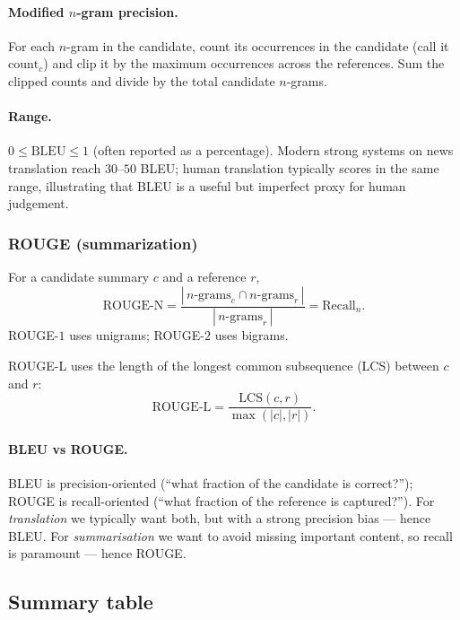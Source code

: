 \paragraph{Modified $n$-gram precision.} For each $n$-gram in the candidate, count its occurrences in the candidate (call it $\mathrm{count}_c$) and clip it by the maximum occurrences across the references. Sum the clipped counts and divide by the total candidate $n$-grams.

\paragraph{Range.} $0 \le \mathrm{BLEU} \le 1$ (often reported as a percentage). Modern strong systems on news translation reach $30$--$50$ BLEU; human translation typically scores in the same range, illustrating that BLEU is a useful but imperfect proxy for human judgement.

\subsubsection*{ROUGE (summarization)}

\begin{definition}
For a candidate summary $c$ and a reference $r$,
\[ \mathrm{ROUGE\text{-}N} = \frac{|\,n\text{-grams}_c \cap n\text{-grams}_r\,|}{|\,n\text{-grams}_r\,|} = \mathrm{Recall}_n. \]
ROUGE-$1$ uses unigrams; ROUGE-$2$ uses bigrams.
\end{definition}

\begin{definition}[ROUGE-L]
ROUGE-L uses the length of the longest common subsequence (LCS) between $c$ and $r$:
\[ \mathrm{ROUGE\text{-}L} = \frac{\mathrm{LCS}(c, r)}{\max(|c|, |r|)}. \]
\end{definition}

\paragraph{BLEU vs ROUGE.} BLEU is precision-oriented (``what fraction of the candidate is correct?''); ROUGE is recall-oriented (``what fraction of the reference is captured?''). For \emph{translation} we typically want both, but with a strong precision bias --- hence BLEU. For \emph{summarisation} we want to avoid missing important content, so recall is paramount --- hence ROUGE.

\subsection{Summary table}

